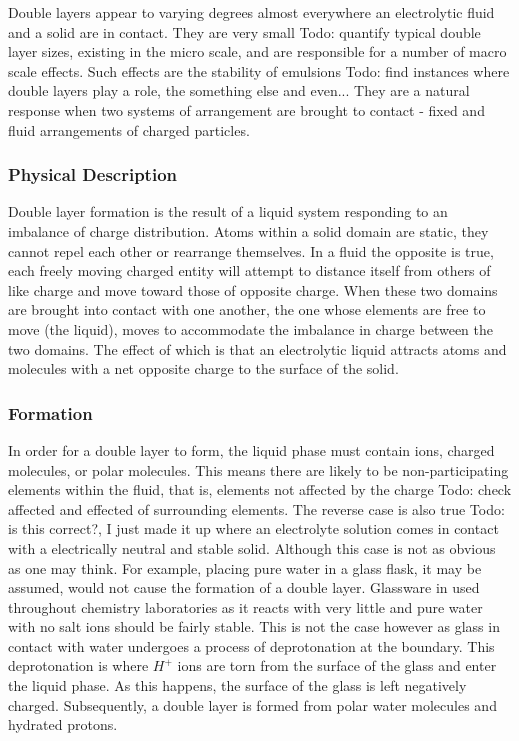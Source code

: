     Double layers appear to varying degrees almost everywhere an electrolytic fluid and a solid are in contact. They are very small {Todo: quantify typical double layer sizes}, existing in the micro scale, and are responsible for a number of macro scale effects. Such effects are the stability of emulsions {Todo: find instances where double layers play a role}, the something else and even... They are a natural response when two systems of arrangement are brought to contact - fixed and fluid arrangements of charged particles.

  \subsubsection*{Physical Description}
    Double layer formation is the result of a liquid system responding to an imbalance of charge distribution. Atoms within a solid domain are static, they cannot repel each other or rearrange themselves. In a fluid the opposite is true, each freely moving charged entity will attempt to distance itself from others of like charge and move toward those of opposite charge. When these two domains are brought into contact with one another, the one whose elements are free to move (the liquid), moves to accommodate the imbalance in charge between the two domains. The effect of which is that an electrolytic liquid attracts atoms and molecules with a net opposite charge to the surface of the solid.

  \subsubsection*{Formation}
    {\color{blue}
    In order for a double layer to form, the liquid phase must contain ions, charged molecules, or polar molecules.
    This means there are likely to be non-participating elements within the fluid, that is, elements not affected by the charge {Todo: check affected and effected} of surrounding elements.
    The reverse case is also true {Todo: is this correct?, I just made it up} where an electrolyte solution comes in contact with a electrically neutral and stable solid. Although this case is not as obvious as one may think. For example, placing pure water in a glass flask, it may be assumed, would not cause the formation of a double layer. Glassware in used throughout chemistry laboratories as it reacts with very little and pure water with no salt ions should be fairly stable. This is not the case however as glass in contact with water undergoes a process of deprotonation at the boundary. This deprotonation is where $H^{+}$ ions are torn from the surface of the glass and enter the liquid phase. As this happens, the surface of the glass is left negatively charged. Subsequently, a double layer is formed from polar water molecules and hydrated protons.
    }



